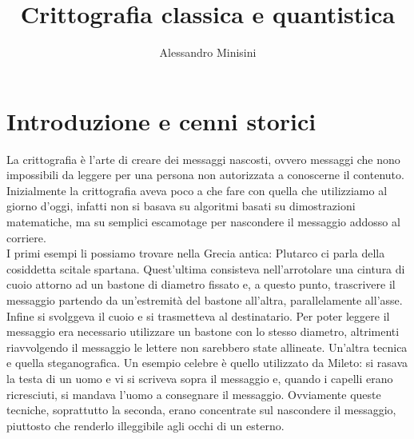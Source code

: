 \documentclass[italian,A4,12pt]{article}
\title{Crittografia classica e quantistica}
\author{Alessandro Minisini}
\affil{Liceo Scientifico Niccolò Copernico}
\date{}
\begin{document}
  \maketitle
  \newpage
  \tableofcontents
  \newpage
  \section{Introduzione e cenni storici}
    La crittografia è l'arte di creare dei messaggi nascosti, ovvero messaggi che nono impossibili da leggere per una persona non autorizzata a conoscerne il contenuto.\\
    Inizialmente la crittografia aveva poco a che fare con quella che utilizziamo al giorno d'oggi, infatti non si basava su algoritmi basati su dimostrazioni matematiche, ma su semplici escamotage per nascondere il messaggio addosso al corriere.\\
    I primi esempi li possiamo trovare nella Grecia antica: Plutarco ci parla della cosiddetta scitale spartana. Quest'ultima consisteva nell'arrotolare una cintura di cuoio attorno ad un bastone di diametro fissato e, a questo punto, trascrivere il messaggio partendo da un'estremità del bastone all'altra, parallelamente all'asse. Infine si svolggeva il cuoio e si trasmetteva al destinatario. Per poter leggere il messaggio era necessario utilizzare un bastone con lo stesso diametro, altrimenti riavvolgendo il messaggio le lettere non sarebbero state allineate. Un'altra tecnica e quella steganografica. Un esempio celebre è quello utilizzato da Mileto: si rasava la testa di un uomo e vi si scriveva sopra il messaggio e, quando i capelli erano ricresciuti, si mandava l'uomo a consegnare il messaggio.
    Ovviamente queste tecniche, soprattutto la seconda, erano concentrate sul nascondere il messaggio, piuttosto che renderlo illeggibile agli occhi di un esterno.\\
\end{document}
